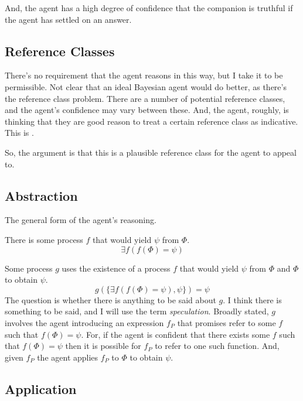 \documentclass[10pt]{article}
\begin{document}
And, the agent has a high degree of confidence that the companion is truthful if the agent has settled on an answer.


\subsection{Reference Classes}
\label{sec:reference-classes}

There's no requirement that the agent reasons in this way, but I take it to be permissible.
Not clear that an ideal Bayesian agent would do better, as there's the reference class problem.
There are a number of potential reference classes, and the agent's confidence may vary between these.
And, the agent, roughly, is thinking that they are good reason to treat a certain reference class as indicative.
This is \textcite{Hajek:2007aa}.

\begin{note}
  So, the argument is that this is a plausible reference class for the agent to appeal to.
\end{note}

\subsection{Abstraction}
\label{sec:abstraction}

\begin{note}
  The general form of the agent's reasoning.
\end{note}

There is some process \(f\) that would yield \(\psi\) from \(\Phi\).
\[
\exists f(f(\Phi) = \psi)
\]

Some process \(g\) uses the existence of a process \(f\) that would yield \(\psi\) from \(\Phi\) and \(\Phi\) to obtain \(\psi\).
\[
  g(\{\exists f(f(\Phi) = \psi), \psi\}) = \psi
\]
The question is whether there is anything to be said about \(g\).
I think there is something to be said, and I will use the term \emph{speculation}.
Broadly stated, \(g\) involves the agent introducing an expression \(f_{P}\) that promises refer to some \(f\) such that \(f(\Phi) = \psi\).
For, if the agent is confident that there exists some \(f\) such that \(f(\Phi) = \psi\) then it is possible for \(f_{P}\) to refer to one such function.
And, given \(f_{P}\) the agent applies \(f_{P}\) to \(\Phi\) to obtain \(\psi\).

\subsection{Application}
\label{sec:application}
\end{document}
